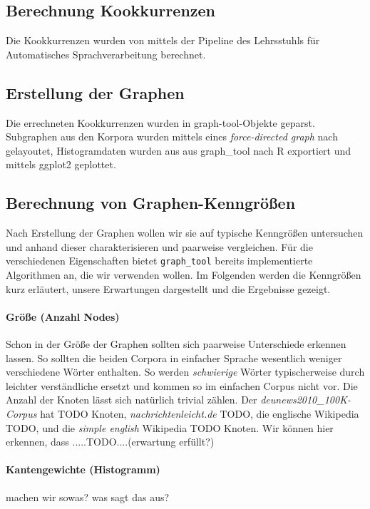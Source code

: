 \documentclass[12pt, a4paper]{article}
\begin{document}
\subsection{Berechnung Kookkurrenzen}

Die Kookkurrenzen wurden von mittels der Pipeline des Lehrsstuhls f\"ur
Automatisches Sprachverarbeitung berechnet.

\subsection{Erstellung der Graphen}

Die errechneten Kookkurrenzen wurden in graph-tool-Objekte geparst. Subgraphen
aus den Korpora wurden mittels eines \emph{force-directed graph} nach
\cite{Hu2005} gelayoutet, Histogramdaten wurden aus aus graph\_tool nach R
exportiert und mittels ggplot2 geplottet.

\subsection{Berechnung von Graphen-Kenngr\"o\ss{}en}

Nach Erstellung der Graphen wollen wir sie auf typische Kenngrößen untersuchen
und anhand dieser charakterisieren und paarweise vergleichen. Für die
verschiedenen Eigenschaften bietet \texttt{graph\_tool} bereits implementierte
Algorithmen an, die wir verwenden wollen. Im Folgenden werden die Kenngrößen
kurz erläutert, unsere Erwartungen dargestellt und die Ergebnisse gezeigt.

\paragraph{Gr\"o\ss{}e (Anzahl Nodes)}
Schon in der Größe der Graphen sollten sich paarweise Unterschiede erkennen
lassen. So sollten die beiden Corpora in einfacher Sprache wesentlich weniger
verschiedene Wörter enthalten. So werden \emph{schwierige} Wörter
typischerweise durch leichter verständliche ersetzt und kommen so im einfachen
Corpus nicht vor. Die Anzahl der Knoten lässt sich natürlich trivial zählen.
Der \emph{deunews2010\_100K-Corpus} hat TODO Knoten,
\emph{nachrichtenleicht.de} TODO, die englische Wikipedia TODO, und die
\emph{simple english} Wikipedia TODO Knoten. Wir können hier erkennen, dass
.....TODO....(erwartung erfüllt?)
 
\paragraph{Kantengewichte (Histogramm)}
machen wir sowas? was sagt das aus?
\end{document}
